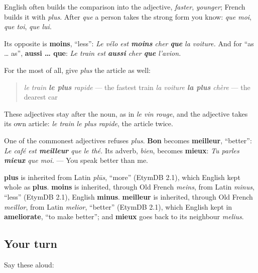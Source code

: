 English often builds the comparison into the adjective, \emph{faster}, \emph{younger}; French builds it with \emph{plus}. After \emph{que} a person takes the strong form you know: \emph{que moi}, \emph{que toi}, \emph{que lui}.

Its opposite is \textbf{moins}, \textquotedblleft{}less\textquotedblright{}: \emph{Le vélo est \textbf{moins} cher \textbf{que} la voiture.} And for \textquotedblleft{}as … as\textquotedblright{}, \textbf{aussi … que}: \emph{Le train est \textbf{aussi} cher \textbf{que} l'avion.}

\begin{grammarlens}[title={Grammar Lens: le plus, and the one that refuses}]
For the most of all, give \emph{plus} the article as well:

\begin{quote}
\emph{le train \textbf{le plus} rapide} — the fastest train \emph{la voiture \textbf{la plus} chère} — the dearest car
\end{quote}

These adjectives stay after the noun, as in \emph{le vin rouge}, and the adjective takes its own article: \emph{le train le plus rapide}, the article twice.

One of the commonest adjectives refuses \emph{plus}. \textbf{Bon} becomes \textbf{meilleur}, \textquotedblleft{}better\textquotedblright{}: \emph{Le café est \textbf{meilleur} que le thé.} Its adverb, \emph{bien}, becomes \textbf{mieux}: \emph{Tu parles \textbf{mieux} que moi.} — You speak better than me.
\end{grammarlens}

\begin{cousinweb}
\textbf{plus} is inherited from Latin \emph{plūs}, \textquotedblleft{}more\textquotedblright{} (EtymDB 2.1), which English kept whole as \textbf{plus}. \textbf{moins} is inherited, through Old French \emph{meins}, from Latin \emph{minus}, \textquotedblleft{}less\textquotedblright{} (EtymDB 2.1), English \textbf{minus}. \textbf{meilleur} is inherited, through Old French \emph{meillor}, from Latin \emph{melior}, \textquotedblleft{}better\textquotedblright{} (EtymDB 2.1), which English kept in \textbf{ameliorate}, \textquotedblleft{}to make better\textquotedblright{}; and \textbf{mieux} goes back to its neighbour \emph{melius}.
\end{cousinweb}

\subsection*{Your turn}
Say these aloud:

